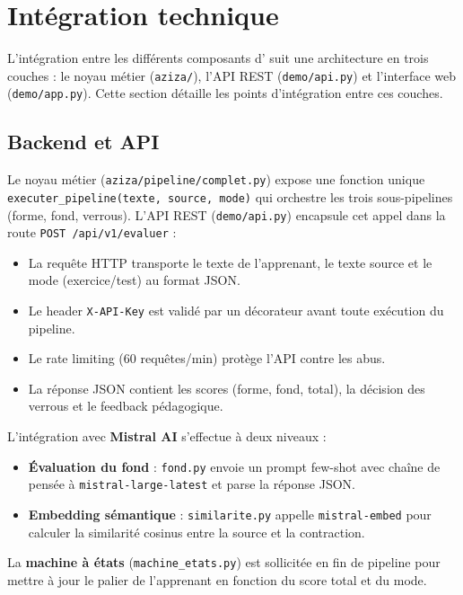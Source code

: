 \section{Intégration technique}

L'intégration entre les différents composants d'\AZIZA{} suit une architecture en trois couches : le noyau métier (\texttt{aziza/}), l'API REST (\texttt{demo/api.py}) et l'interface web (\texttt{demo/app.py}). Cette section détaille les points d'intégration entre ces couches.

\subsection{Backend et API}

Le noyau métier (\texttt{aziza/pipeline/complet.py}) expose une fonction unique \texttt{executer\_pipeline(texte, source, mode)} qui orchestre les trois sous-pipelines (forme, fond, verrous). L'API REST (\texttt{demo/api.py}) encapsule cet appel dans la route \texttt{POST /api/v1/evaluer} :

\begin{itemize}
    \item La requête HTTP transporte le texte de l'apprenant, le texte source et le mode (exercice/test) au format JSON.
    \item Le header \texttt{X-API-Key} est validé par un décorateur avant toute exécution du pipeline.
    \item Le rate limiting (60 requêtes/min) protège l'API contre les abus.
    \item La réponse JSON contient les scores (forme, fond, total), la décision des verrous et le feedback pédagogique.
\end{itemize}

L'intégration avec \textbf{Mistral AI} s'effectue à deux niveaux :

\begin{itemize}
    \item \textbf{Évaluation du fond} : \texttt{fond.py} envoie un prompt few-shot avec chaîne de pensée à \texttt{mistral-large-latest} et parse la réponse JSON.
    \item \textbf{Embedding sémantique} : \texttt{similarite.py} appelle \texttt{mistral-embed} pour calculer la similarité cosinus entre la source et la contraction.
\end{itemize}

La \textbf{machine à états} (\texttt{machine\_etats.py}) est sollicitée en fin de pipeline pour mettre à jour le palier de l'apprenant en fonction du score total et du mode.

